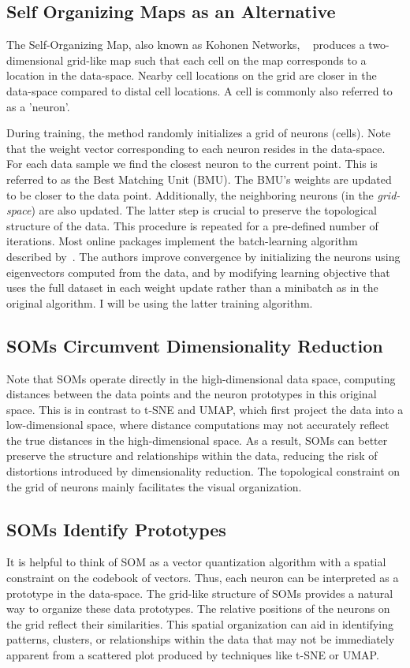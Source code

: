 \subsection*{Self Organizing Maps as an Alternative}

The Self-Organizing Map, also known as Kohonen Networks, ~\cite{kohonen1990self} produces a two-dimensional grid-like map such that each cell on the map corresponds to a location in the data-space. Nearby cell locations on the grid are closer in the data-space compared to distal cell locations. A cell is commonly also referred to as a 'neuron'.

During training, the method randomly initializes a grid of neurons (cells). Note that the weight vector corresponding to each neuron resides in the data-space. For each data sample we find the closest neuron to the current point. This is referred to as the Best Matching Unit (BMU). The BMU's weights are updated to be closer to the data point. Additionally, the neighboring neurons (in the \textit{grid-space}) are also updated. The latter step is crucial to preserve the topological structure of the data. This procedure is repeated for a pre-defined number of iterations. Most online packages implement the batch-learning algorithm described by~\cite{kinouchi2002quick}. The authors improve convergence by initializing the neurons using eigenvectors computed from the data, and by modifying learning objective that uses the full dataset in each weight update rather than a minibatch as in the original algorithm.  I will be using the latter training algorithm.

\subsection*{SOMs Circumvent Dimensionality Reduction}

Note that SOMs operate directly in the high-dimensional data space, computing distances between the data points and the neuron prototypes in this original space. This is in contrast to t-SNE and UMAP, which first project the data into a low-dimensional space, where distance computations may not accurately reflect the true distances in the high-dimensional space. As a result, SOMs can better preserve the structure and relationships within the data, reducing the risk of distortions introduced by dimensionality reduction. The topological constraint on the grid of neurons mainly facilitates the visual organization.

\subsection*{SOMs Identify Prototypes}
It is helpful to think of SOM as a vector quantization algorithm with a spatial constraint on the codebook of vectors. Thus, each neuron can be interpreted as a prototype in the data-space. The grid-like structure of SOMs provides a natural way to organize these data prototypes. The relative positions of the neurons on the grid reflect their similarities. This spatial organization can aid in identifying patterns, clusters, or relationships within the data that may not be immediately apparent from a scattered plot produced by techniques like t-SNE or UMAP.

